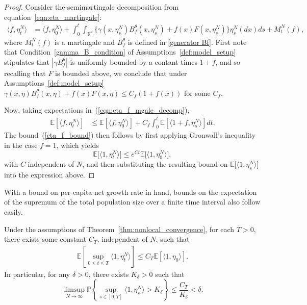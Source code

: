 \documentclass[EJP]{ejpecp} %
\newcommand{\IP}{\mathbb P}
\newcommand{\IE}{\mathbb E}
\newcommand{\IR}{\mathbb R}
\begin{document}
\begin{proof}
Consider the semimartingale decomposition from equation~\eqref{eqn:eta_martingale}:
\begin{align} \label{eqn:eta_f_mgale_decomp}
    \langle f, \eta^N_t \rangle
    &=
    \langle f, \eta^N_0 \rangle
    + \int_0^t \int_{\IR^d} \big\{
        \gamma(x, \eta^N_s) B^\theta_f(x, \eta^N_s)
        + f(x) F(x, \eta^N_s)
        \big\} \eta^N_s(dx) ds
    + M^N_t(f) ,
\end{align}
where $M^N_t(f)$ is a martingale and $B^\theta_f$ is defined in \eqref{generator Bf}.
First note that Condition~\ref{gamma_B_condition} of Assumptions~\ref{def:model_setup}
stipulates that $|\gamma B^\theta_f|$ is uniformly bounded by a contant times $1 + f$,
and so recalling that $F$ is bounded above, we conclude that
under Assumptions~\ref{def:model_setup}
$\gamma(x, \eta) B^\theta_f(x, \eta) + f(x) F(x, \eta) \le C_f (1 + f(x))$ for some $C_f$.

Now, taking expectations in~(\ref{eqn:eta_f_mgale_decomp}),
    \begin{align}
\label{bound on intfdeta}
        \IE\left[ \langle f, \eta^N_t \rangle \right]
        &\le
        \IE\left[ \langle f, \eta^N_0 \rangle \right]
        + C_f \int_0^t \IE\left[ \langle 1 + f, \eta^N_s \rangle \right] dt .
    \end{align}
The bound~(\ref{eta_f_bound}) then follows by first applying Gronwall's
inequality in the case $f=1$, which yields
\[
	\IE\big[\langle 1,\eta_t^N\rangle\big]\leq e^{Ct}\IE\big[\langle 1,\eta_0^N\rangle\big],
\]
with $C$ independent of $N$, and then substituting 
the resulting bound on $\IE\big[\langle 1,\eta_s^N\rangle\big]$ into the
expression above.
\end{proof}

With a bound on per-capita net growth rate in hand,
bounds on the expectation of the supremum of 
the total population size over a finite time interval also follow easily.

\begin{lemma}
    \label{lem:eta_compact_containment}
    Under the assumptions of Theorem~\ref{thm:nonlocal_convergence},
    for each $T>0$, there exists some constant $C_T$,
independent of $N$,
    such that
    \begin{align}
        \label{eqn:eta_mass_bound}
        \IE\left[
            \sup_{0 \le t \le T}
            \langle 1, \eta^{N}_t \rangle
        \right]
        \le C_T \IE[\langle 1,\eta_0\rangle].
    \end{align}
    In particular, for any $\delta > 0$, there exists $K_{\delta}>0$ such that
    \begin{equation}
    \limsup_{N \to \infty}
        \IP \left\{ \sup_{s \in [0,T]}
            \langle 1 ,\eta^{N}_{s}\rangle
            > K_\delta \right\}
        \leq \frac{C_T}{K_{\delta}}
        < \delta.
    \end{equation}
\end{lemma}
\end{document}
